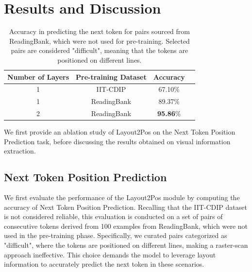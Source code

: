 \section{Results and Discussion}

\begin{table}[ht]
  \centering
  \small
  \begin{adjustbox}{max width=\textwidth}
  \begin{threeparttable}
  \begin{tabular}{cccc}
      \toprule
          Number of Layers & Pre-training Dataset & Accuracy \\ 
      \midrule
          1                & IIT-CDIP             & 67.10\%  \\
          1                & ReadingBank          & 89.37\%  \\
          2                & ReadingBank          & \textbf{95.86}\%   \\
      \bottomrule
  \end{tabular}
  \end{threeparttable}
  \end{adjustbox}
  \caption{Accuracy in predicting the next token for pairs sourced from ReadingBank, which were not used for pre-training. Selected pairs are considered "difficult", meaning that the tokens are positioned on different lines.}
  \label{table:next-token-prediction-results}
\end{table}

We first provide an ablation study of Layout2Pos on the Next Token Position Prediction task, before discussing the results obtained on visual information extraction.

\subsection{Next Token Position Prediction}
\label{section:layout2pos-results-ntpp}

We first evaluate the performance of the Layout2Pos module by computing the accuracy of Next Token Position Prediction. Recalling that the IIT-CDIP dataset is not considered reliable, this evaluation is conducted on a set of pairs of consecutive tokens derived from 100 examples from ReadingBank, which were not used in the pre-training phase. Specifically, we curated pairs categorized as "difficult", where the tokens are positioned on different lines, making a raster-scan approach ineffective. This choice demands the model to leverage layout information to accurately predict the next token in these scenarios.

